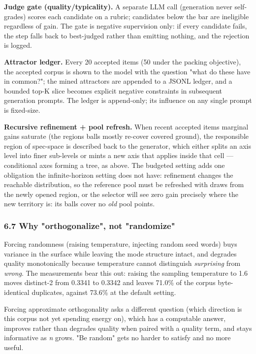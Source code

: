 \documentclass[
  10pt,
]{article}
\theoremstyle{plain}
\theoremstyle{definition}
\begin{document}
\textbf{Judge gate (quality/typicality).} A separate LLM call
(generation never self-grades) scores each candidate on a rubric;
candidates below the bar are ineligible regardless of gain. The gate is
negative supervision only: if every candidate fails, the step falls back
to best-judged rather than emitting nothing, and the rejection is
logged.

\textbf{Attractor ledger.} Every 20 accepted items (50 under the packing
objective), the accepted corpus is shown to the model with the question
"what do these have in common?"; the mined attractors are appended to a
JSONL ledger, and a bounded top-K slice becomes explicit negative
constraints in subsequent generation prompts. The ledger is append-only;
its influence on any single prompt is fixed-size.

\textbf{Recursive refinement + pool refresh.} When recent accepted
items\textquotesingle{} marginal gains saturate (the
region\textquotesingle s balls mostly re-cover covered ground), the
responsible region of spec-space is described back to the generator,
which either splits an axis level into finer sub-levels or mints a new
axis that applies inside that cell --- conditional axes forming a tree,
as above. The budgeted setting adds one obligation the infinite-horizon
setting does not have: refinement changes the reachable distribution, so
the reference pool must be refreshed with draws from the newly opened
region, or the selector will see zero gain precisely where the new
territory is: its balls cover no \emph{old} pool points.

\subsubsection{6.7 Why "orthogonalize", not
"randomize"}\label{67-why-orthogonalize-not-randomize}

Forcing randomness (raising temperature, injecting random seed words)
buys variance in the surface while leaving the mode structure intact,
and degrades quality monotonically because temperature cannot
distinguish \emph{surprising} from \emph{wrong}. The measurements bear
this out: raising the sampling temperature to 1.6 moves distinct-2 from
0.3341 to 0.3342 and leaves 71.0\% of the corpus byte-identical
duplicates, against 73.6\% at the default setting.

Forcing approximate orthogonality asks a different question (which
direction is this corpus not yet spending energy on), which has a
computable answer, improves rather than degrades quality when paired
with a quality term, and stays informative as \emph{n} grows. "Be
random" gets no harder to satisfy and no more useful.
\end{document}
